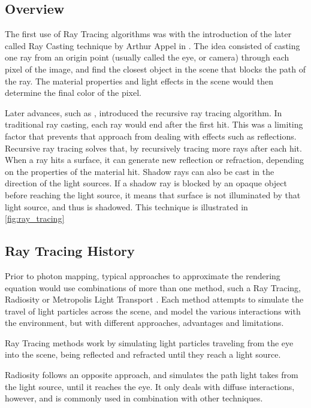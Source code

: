 \documentclass[main.tex]{subfiles}
\begin{document}
\subsection{Overview}

The first use of Ray Tracing algorithms was with the introduction of the later called Ray Casting technique by Arthur Appel in \cite{appel1968some}. The idea consisted of casting one ray from an origin point (usually called the eye, or camera) through each pixel of the image, and find the closest object in the scene that blocks the path of the ray. The material properties and light effects in the scene would then determine the final color of the pixel.

Later advances, such as \cite{whitted2005improved}, introduced the recursive ray tracing algorithm. In traditional ray casting, each ray would end after the first hit. This was a limiting factor that prevents that approach from dealing with effects such as reflections. Recursive ray tracing solves that, by recursively tracing more rays after each hit. When a ray hits a surface, it can generate new reflection or refraction, depending on the properties of the material hit. Shadow rays can also be cast in the direction of the light sources. If a shadow ray is blocked by an opaque object before reaching the light source, it means that surface is not illuminated by that light source, and thus is shadowed. This technique is illustrated in \cref{fig:ray_tracing}





\subsection{Ray Tracing History}

Prior to photon mapping, typical approaches to approximate the rendering equation would use combinations of more than one method, such a Ray Tracing, Radiosity or Metropolis Light Transport \cite{wallace1987two,veach1997metropolis}. Each method attempts to simulate the travel of light particles across the scene, and model the various interactions with the environment, but with different approaches, advantages and limitations.

Ray Tracing methods work by simulating light particles traveling from the eye into the scene, being reflected and refracted until they reach a light source.

Radiosity follows an opposite approach, and simulates the path light takes from the light source, until it reaches the eye. It only deals with diffuse interactions, however, and is commonly used in combination with other techniques.
\end{document}
